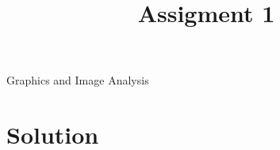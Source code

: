 \documentclass{article}
\title{Assigment 1}
\begin{document}
	\maketitle
	\begin{center} Graphics and Image Analysis
	\end{center}
	
	
	\section{Solution}
	
	
	
	
	
\end{document}
